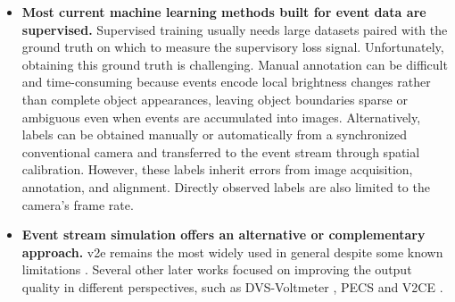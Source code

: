 \begin{itemize}
  
  \item \textbf{Most current machine learning methods built for event data are supervised.} Supervised training usually needs large  datasets paired with the ground truth on which to measure the supervisory loss signal.  Unfortunately, obtaining this ground truth is challenging. Manual annotation can be difficult and time-consuming because events encode local brightness changes rather than complete object appearances, leaving object boundaries sparse or ambiguous even when events are accumulated into images. Alternatively, labels can be obtained manually or automatically from a synchronized conventional camera and transferred to the event stream through spatial calibration. However, these labels inherit errors from image acquisition, annotation, and alignment. Directly observed labels are also limited to the camera’s frame rate.  
  

  
  

  
  

    \item \textbf{Event stream simulation offers an alternative or complementary approach.} v2e remains the most widely used in general despite some known limitations \cite{hu2021v2e}. Several other later works focused on improving the output quality in different perspectives, such as DVS-Voltmeter \cite{lin2022dvsvoltmeter}, PECS \cite{han2024pecs} and V2CE \cite{zhang2024v2ce}. 
  

\end{itemize}
